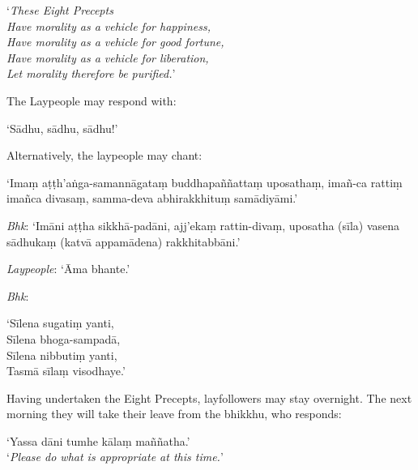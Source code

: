 ‘\emph{These Eight Precepts\\
Have morality as a vehicle for happiness,\\
Have morality as a vehicle for good fortune,\\
Have morality as a vehicle for liberation,\\
Let morality therefore be purified.}’

The Laypeople may respond with:

‘Sādhu, sādhu, sādhu!’

Alternatively, the laypeople may chant:

‘Imaṃ aṭṭh'aṅga-samannāgataṃ buddhapaññattaṃ uposathaṃ, imañ-ca rattiṃ imañca
divasaṃ, samma-deva abhirakkhituṃ samādiyāmi.’

\emph{Bhk}: ‘Imāni aṭṭha sikkhā-padāni, ajj'ekaṃ rattin-divaṃ, uposatha (sīla)
vasena sādhukaṃ (katvā appamādena) rakkhitabbāni.’

\emph{Laypeople}: ‘Āma bhante.’

\emph{Bhk}:

‘Sīlena sugatiṃ yanti,\\
Sīlena bhoga-sampadā,\\
Sīlena nibbutiṃ yanti,\\
Tasmā sīlaṃ visodhaye.’

Having undertaken the Eight Precepts, layfollowers may stay overnight. The next
morning they will take their leave from the bhikkhu, who responds:

‘Yassa dāni tumhe kālaṃ maññatha.’\\
‘\emph{Please do what is appropriate at this time.}’

